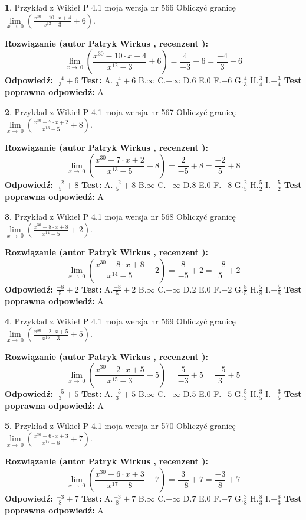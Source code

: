 \documentclass[12pt, a4paper]{article}
\theoremstyle{definition} %
\newtheorem{zad}{}
\newcommand{\zadStart}[1]{\begin{zad}#1\newline}
\newcommand{\zadStop}{\end{zad}}
\newcommand{\rozwStart}[2]{\noindent \textbf{Rozwiązanie (autor #1 , recenzent #2): }\newline}
\newcommand{\rozwStop}{\newline}
\newcommand{\odpStart}{\noindent \textbf{Odpowiedź:}\newline}
\newcommand{\odpStop}{\newline}
\newcommand{\testStart}{\noindent \textbf{Test:}\newline}
\newcommand{\testStop}{\newline}
\newcommand{\kluczStart}{\noindent \textbf{Test poprawna odpowiedź:}\newline}
\newcommand{\kluczStop}{\newline}
\begin{document}
\zadStart{Przykład z Wikieł P 4.1 moja wersja nr 566}
Obliczyć granicę $\lim\limits_{x\to\ 0}(\frac{x^{30}-10 \cdot x +4}{x^{12}-3}+6)$.
\zadStop
\rozwStart{Patryk Wirkus}{}
$$\lim\limits_{x\to\ 0}(\frac{x^{30}-10 \cdot x +4}{x^{12}-3}+6)=\frac{4}{-3}+6=\frac{-4}{3}+6$$
\rozwStop
\odpStart
$\frac{-4}{3}+6$
\odpStop
\testStart
A.$\frac{-4}{3}+6$
B.$\infty$
C.$-\infty$
D.$6$
E.$0$
F.$-6$
G.$\frac{4}{3}$
H.$\frac{3}{4}$
I.$-\frac{3}{4}$
\testStop
\kluczStart
A
\kluczStop



\zadStart{Przykład z Wikieł P 4.1 moja wersja nr 567}
Obliczyć granicę $\lim\limits_{x\to\ 0}(\frac{x^{30}-7 \cdot x +2}{x^{13}-5}+8)$.
\zadStop
\rozwStart{Patryk Wirkus}{}
$$\lim\limits_{x\to\ 0}(\frac{x^{30}-7 \cdot x +2}{x^{13}-5}+8)=\frac{2}{-5}+8=\frac{-2}{5}+8$$
\rozwStop
\odpStart
$\frac{-2}{5}+8$
\odpStop
\testStart
A.$\frac{-2}{5}+8$
B.$\infty$
C.$-\infty$
D.$8$
E.$0$
F.$-8$
G.$\frac{2}{5}$
H.$\frac{5}{2}$
I.$-\frac{5}{2}$
\testStop
\kluczStart
A
\kluczStop



\zadStart{Przykład z Wikieł P 4.1 moja wersja nr 568}
Obliczyć granicę $\lim\limits_{x\to\ 0}(\frac{x^{30}-8 \cdot x +8}{x^{14}-5}+2)$.
\zadStop
\rozwStart{Patryk Wirkus}{}
$$\lim\limits_{x\to\ 0}(\frac{x^{30}-8 \cdot x +8}{x^{14}-5}+2)=\frac{8}{-5}+2=\frac{-8}{5}+2$$
\rozwStop
\odpStart
$\frac{-8}{5}+2$
\odpStop
\testStart
A.$\frac{-8}{5}+2$
B.$\infty$
C.$-\infty$
D.$2$
E.$0$
F.$-2$
G.$\frac{8}{5}$
H.$\frac{5}{8}$
I.$-\frac{5}{8}$
\testStop
\kluczStart
A
\kluczStop



\zadStart{Przykład z Wikieł P 4.1 moja wersja nr 569}
Obliczyć granicę $\lim\limits_{x\to\ 0}(\frac{x^{30}-2 \cdot x +5}{x^{15}-3}+5)$.
\zadStop
\rozwStart{Patryk Wirkus}{}
$$\lim\limits_{x\to\ 0}(\frac{x^{30}-2 \cdot x +5}{x^{15}-3}+5)=\frac{5}{-3}+5=\frac{-5}{3}+5$$
\rozwStop
\odpStart
$\frac{-5}{3}+5$
\odpStop
\testStart
A.$\frac{-5}{3}+5$
B.$\infty$
C.$-\infty$
D.$5$
E.$0$
F.$-5$
G.$\frac{5}{3}$
H.$\frac{3}{5}$
I.$-\frac{3}{5}$
\testStop
\kluczStart
A
\kluczStop



\zadStart{Przykład z Wikieł P 4.1 moja wersja nr 570}
Obliczyć granicę $\lim\limits_{x\to\ 0}(\frac{x^{30}-6 \cdot x +3}{x^{17}-8}+7)$.
\zadStop
\rozwStart{Patryk Wirkus}{}
$$\lim\limits_{x\to\ 0}(\frac{x^{30}-6 \cdot x +3}{x^{17}-8}+7)=\frac{3}{-8}+7=\frac{-3}{8}+7$$
\rozwStop
\odpStart
$\frac{-3}{8}+7$
\odpStop
\testStart
A.$\frac{-3}{8}+7$
B.$\infty$
C.$-\infty$
D.$7$
E.$0$
F.$-7$
G.$\frac{3}{8}$
H.$\frac{8}{3}$
I.$-\frac{8}{3}$
\testStop
\kluczStart
A
\kluczStop
\end{document}
